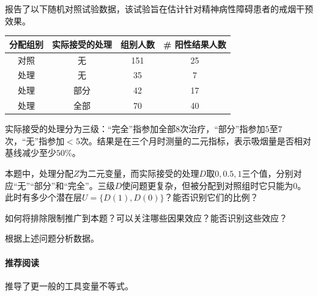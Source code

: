 \citet[][Table 3]{sanders2021incorporating}报告了以下随机对照试验数据，该试验旨在估计针对精神病性障碍患者的戒烟干预效果。 

\begin{center}
\begin{tabular}{cccc}
\hline  
分配组别& 实际接受的处理 &组别人数& \# 阳性结果人数 \\
\hline  
对照 & 无& 151 &25 \\
处理& 无& 35 & 7 \\
处理& 部分& 42& 17 \\
处理& 全部& 70& 40\\
\hline 
\end{tabular}
\end{center}

实际接受的处理分为三级：“完全”指参加全部$8$次治疗，“部分”指参加$5$至$7$次，“无”指参加$<5$次。结果是在三个月时测量的二元指标，表示吸烟量是否相对基线减少至少$50\%$。


本题中，处理分配$Z$为二元变量，而实际接受的处理$D$取$0, 0.5, 1$三个值，分别对应“无”“部分”和“完全”。三级$D$使问题更复杂，但被分配到对照组时它只能为0。此时有多少个潜在层$U = \{ D(1), D(0) \} $？能否识别它们的比例？

如何将排除限制推广到本题？可以关注哪些因果效应？能否识别这些效应？ 

根据上述问题分析数据。 



  

 \paragraph{推荐阅读}

\citet{balke1997bounds}推导了更一般的工具变量不等式。 

